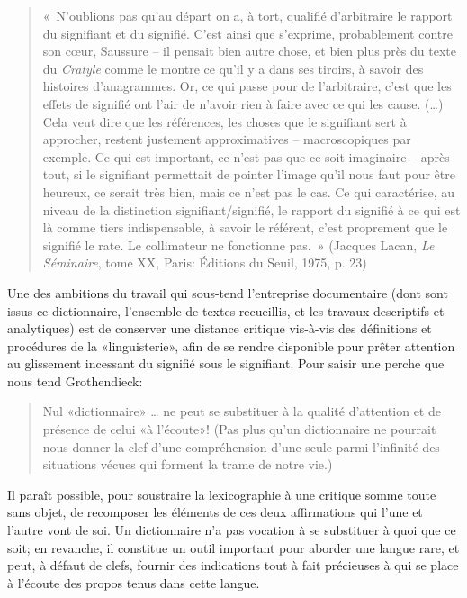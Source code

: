 \begin{quote}
« N'oublions pas qu'au départ on a, à tort, qualifié d'arbitraire le rapport du signifiant et du signifié. C'est ainsi que s'exprime, probablement contre son cœur, Saussure -- il pensait bien autre chose, et bien plus près du texte du \emph{Cratyle} comme le montre ce qu'il y a dans ses tiroirs, à savoir des histoires d'anagrammes. Or, ce qui passe pour de l'arbitraire, c'est que les effets de signifié ont l'air de n'avoir rien à faire avec ce qui les cause.
(…) Cela veut dire que les références, les choses que le signifiant sert à approcher, restent justement approximatives -- macroscopiques par exemple. Ce qui est important, ce n'est pas que ce soit imaginaire -- après tout, si le signifiant permettait de pointer l'image qu'il nous faut pour être heureux, ce serait très bien, mais ce n'est pas le cas. Ce qui caractérise, au niveau de la distinction signifiant/signifié, le rapport du signifié à ce qui est là comme tiers indispensable, à savoir le référent, c'est proprement que le signifié le rate. Le collimateur ne fonctionne pas. » (Jacques Lacan, \emph{Le Séminaire}, tome XX, Paris: Éditions du Seuil, 1975, p. 23)
\end{quote}

Une des ambitions du travail qui sous-tend l'entreprise documentaire (dont sont issus ce dictionnaire, l'ensemble de textes recueillis, et les travaux descriptifs et analytiques) est de conserver une distance critique vis-à-vis des définitions et procédures de la «linguisterie», afin de se rendre disponible pour prêter attention au glissement incessant du signifié sous le signifiant. Pour saisir une perche que nous tend Grothendieck:

\begin{quotation}
    Nul «dictionnaire» {\dots} ne peut se substituer à la qualité d'attention et de présence de celui «à l'écoute»! (Pas plus qu'un dictionnaire ne pourrait nous donner la clef d'une compréhension d'une seule parmi l'infinité des situations vécues qui forment la trame de notre vie.) \parencite[1257]{grothendieck_recoltes_2021}
\end{quotation}

Il paraît possible, pour soustraire la lexicographie à une critique somme toute sans objet, de recomposer les éléments de ces deux affirmations qui l'une et l'autre vont de soi. Un dictionnaire n'a pas vocation à se substituer à quoi que ce soit; en revanche, il constitue un outil important pour aborder une langue rare, et peut, à défaut de clefs, fournir des indications tout à fait précieuses à qui se place à l'écoute des propos tenus dans cette langue.

